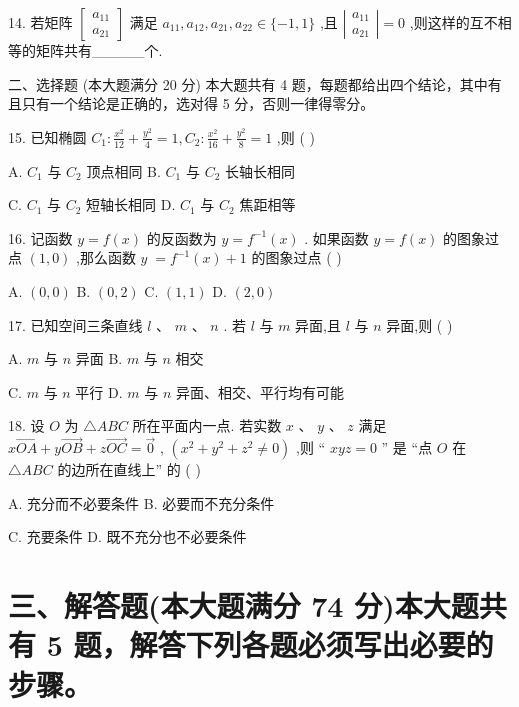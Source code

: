 \documentclass[10pt]{article}
\begin{document}
14. 若矩阵 \(\left\lbrack  \begin{array}{l} {a}_{11} \\  {a}_{21} \end{array}\right\rbrack\) 满足 \({a}_{11},{a}_{12},{a}_{21},{a}_{22} \in  \{  - 1,1\}\) ,且 \(\left| \begin{array}{l} {a}_{11} \\  {a}_{21} \end{array}\right|  = 0\) ,则这样的互不相等的矩阵共有\_\_\_\_\_个.

二、选择题 (本大题满分 20 分) 本大题共有 4 题，每题都给出四个结论，其中有且只有一个结论是正确的，选对得 5 分，否则一律得零分。

15. 已知椭圆 \({C}_{1} : \frac{{x}^{2}}{12} + \frac{{y}^{2}}{4} = 1,{C}_{2} : \frac{{x}^{2}}{16} + \frac{{y}^{2}}{8} = 1\) ,则 ( )

A. \({C}_{1}\) 与 \({C}_{2}\) 顶点相同 B. \({C}_{1}\) 与 \({C}_{2}\) 长轴长相同

C. \({C}_{1}\) 与 \({C}_{2}\) 短轴长相同 D. \({C}_{1}\) 与 \({C}_{2}\) 焦距相等

16. 记函数 \(y = f\left( x\right)\) 的反函数为 \(y = {f}^{-1}\left( x\right)\) . 如果函数 \(y = f\left( x\right)\) 的图象过点 \(\left( {1,0}\right)\) ,那么函数 \(y \; = {f}^{-1}\left( x\right)  + 1\) 的图象过点 ( )

A. \(\left( {0,0}\right)\) B. \(\left( {0,2}\right)\) C. \(\left( {1,1}\right)\) D. \(\left( {2,0}\right)\)

17. 已知空间三条直线 \(l\text{ 、 }m\text{ 、 }n\) . 若 \(l\) 与 \(m\) 异面,且 \(l\) 与 \(n\) 异面,则 ( )

A. \(m\) 与 \(n\) 异面 B. \(m\) 与 \(n\) 相交

C. \(m\) 与 \(n\) 平行 D. \(m\) 与 \(n\) 异面、相交、平行均有可能

18. 设 \(O\) 为 \(\bigtriangleup {ABC}\) 所在平面内一点. 若实数 \(x\text{ 、 }y\text{ 、 }z\) 满足 \(x\overrightarrow{OA} + y\overrightarrow{OB} + z\overrightarrow{OC} = \overrightarrow{0}\) , \(\left( {{x}^{2} + {y}^{2} + {z}^{2} \neq  0}\right)\) ,则 “ \({xyz} = 0\) ” 是 “点 \(O\) 在 \(\bigtriangleup {ABC}\) 的边所在直线上” 的 ( )

A. 充分而不必要条件 B. 必要而不充分条件

C. 充要条件 D. 既不充分也不必要条件

\section*{三、解答题(本大题满分 74 分)本大题共有 5 题，解答下列各题必须写出必要的步骤。}
\end{document}
